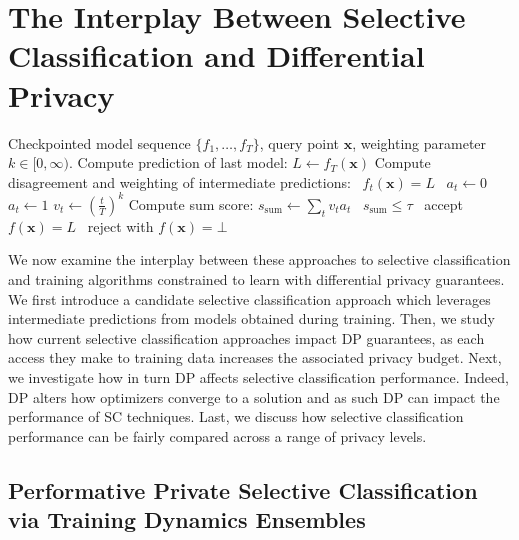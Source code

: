 \section{The Interplay Between Selective Classification and Differential Privacy}

\begin{algorithm}[t]
	\caption{\sctd~\citep{rabanser2022selective}}\label{alg:sctd}
	\begin{algorithmic}[1]
	\Require Checkpointed model sequence $\{f_1,\ldots,f_T\}$, query point $\bm{x}$, weighting parameter $k \in [0,\infty)$.
    \State Compute prediction of last model: $L \gets f_T(\bm{x})$
    \State Compute disagreement and weighting of intermediate predictions: 
        \State \algorithmicif\ $f_t(\bm{x}) = L$ \algorithmicthen\ $a_t \gets 0$ \algorithmicelse\ $a_t \gets 1$
        \State $v_t \gets (\frac{t}{T})^k$
    \EndFor
\State Compute sum score: $s_\text{sum} \gets \sum_{t} v_t a_t$
    \State \algorithmicif\ $s_\text{sum} \leq \tau$ \algorithmicthen\ accept $f(\bm{x}) = L$ \algorithmicelse\ reject with $f(\bm{x}) = \bot$
	\end{algorithmic}
\end{algorithm}

We now examine the interplay between these approaches to selective classification and training algorithms constrained to learn with differential privacy guarantees. We first introduce a candidate selective classification approach which leverages intermediate predictions from models obtained during training. Then, we study how current selective classification approaches impact DP guarantees, as each access they make to training data increases the associated privacy budget. Next, we investigate how in turn DP affects selective classification performance. Indeed, DP alters how optimizers converge to a solution and as such DP can impact the performance of SC techniques. Last, we discuss how selective classification performance can be fairly compared across a range of privacy levels.

\subsection{Performative Private Selective Classification via Training Dynamics Ensembles}


